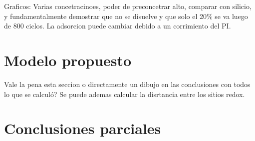 		Graficos: Varias concetracinoes, poder de preconcetrar alto, comparar con silicio, y fundamentalmente demostrar que no se disuelve y que solo el 20\% se va luego de 800 ciclos.
		La adsorcion puede cambiar debido a un corrimiento del PI.


\section{Modelo propuesto}

Vale la pena esta seccion o directamente un dibujo en las conclusiones con todos lo que se calculó? Se puede ademas calcular la disrtancia entre los sitios redox.

\section{Conclusiones parciales}





	


